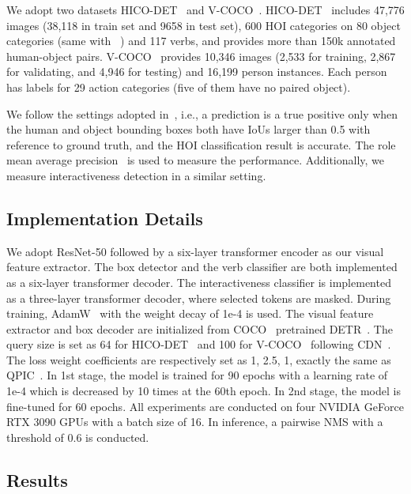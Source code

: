 \documentclass[runningheads]{llncs}
\begin{document}
 We adopt two datasets HICO-DET~\cite{hicodet} and V-COCO~\cite{vcoco}. HICO-DET~\cite{hicodet} includes 47,776 images (38,118 in train set and 9658 in test set), 600 HOI categories on 80 object categories (same with ~\cite{coco}) and 117 verbs, and provides more than 150k annotated human-object pairs. V-COCO~\cite{vcoco} provides 10,346 images (2,533 for training, 2,867 for validating, and 4,946 for testing) and 16,199 person instances. Each person has labels for 29 action categories (five of them have no paired object). 

 We follow the settings adopted in~\cite{hicodet}, i.e., a prediction is a true positive only when the human and object bounding boxes both have IoUs larger than 0.5 with reference to ground truth, and the HOI classification result is accurate. The role mean average precision~\cite{vcoco} is used to measure the performance. Additionally, we measure interactiveness detection in a similar setting. 

\subsection{Implementation Details}\label{sec:imple}
We adopt ResNet-50 followed by a six-layer transformer encoder as our visual feature extractor. The box detector and the verb classifier are both implemented as a six-layer transformer decoder. The interactiveness classifier is implemented as a three-layer transformer decoder, where selected tokens are masked. 
During training, AdamW~\cite{adamw} with the weight decay of 1e-4 is used. The visual feature extractor and box decoder are initialized from COCO~\cite{coco} pretrained DETR~\cite{detr}. The query size is set as 64 for HICO-DET~\cite{hicodet} and 100 for V-COCO~\cite{vcoco} following CDN~\cite{cdn}. The loss weight coefficients  are respectively set as 1, 2.5, 1, exactly the same as QPIC~\cite{qpic}. 
In 1st stage, the model is trained for 90 epochs with a learning rate of 1e-4 which is decreased by 10 times at the 60th epoch. In 2nd stage, the model is fine-tuned for 60 epochs.
All experiments are conducted on four NVIDIA GeForce RTX 3090 GPUs with a batch size of 16. 
In inference, a pairwise NMS with a threshold of 0.6 is conducted. 

\subsection{Results}\label{sec:result}
\end{document}
